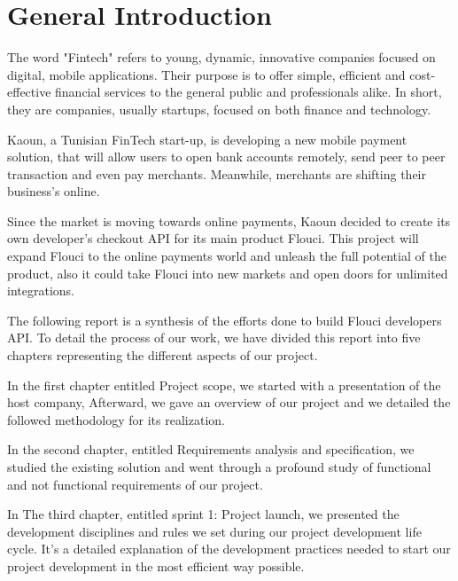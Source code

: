 \chapter*{General Introduction}
\graphicspath{{Introduction/figures/}}
\begin{spacing}{1.1}

The word "Fintech" refers to young, dynamic, innovative companies focused on digital, mobile applications. Their purpose is to offer simple, efficient and cost-effective financial services to the general public and professionals alike. In short, they are companies, usually startups, focused on both finance and technology.\newline

Kaoun, a Tunisian FinTech start-up, is developing a new mobile payment solution, that will allow users to open bank accounts remotely, send peer to peer transaction and even pay merchants.  Meanwhile, merchants are shifting their business's online.  \newline


Since the market is moving towards online payments, Kaoun decided to create its own developer's checkout API for its main product Flouci. This project will expand Flouci to the online payments world and unleash the full potential of the product, also it could take Flouci into new markets and open doors for unlimited integrations.\newline


The following report is a synthesis of the efforts done to build Flouci developers API.
To detail the process of our work, we have divided this report into five chapters representing the different aspects of our project.

In the first chapter entitled Project scope, we started with a presentation of the host company, Afterward,  we gave an overview of our project and we detailed the followed methodology for its realization.

In the second chapter, entitled Requirements analysis and specification, we studied the existing solution and went through a profound study of functional and not functional requirements of our project.

In The third chapter, entitled sprint 1:  Project launch, we presented the development disciplines and rules we set during our project development life cycle. It's a detailed explanation of the development practices needed to start our project development in the most efficient way possible. 


\end{spacing}

